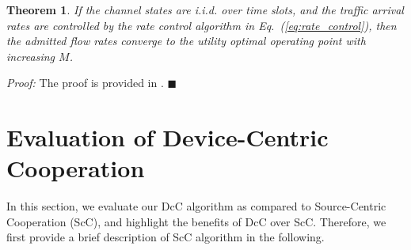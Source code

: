 \documentclass[conference]{IEEEtran}
\newtheorem{theorem}{Theorem}
\begin{document}
\begin{theorem}\label{eec_theorem2}
If the channel states are i.i.d. over time slots, and the traffic arrival rates are controlled by the rate control algorithm in Eq.~(\ref{eq:rate_control}), then the admitted flow rates converge to the utility optimal operating point with increasing $M$.
\end{theorem}
{\em Proof:} The proof is provided in \cite{thisTechRep}.
$\blacksquare$

\section{\label{sec:DcC_vs_ScC} Evaluation of Device-Centric Cooperation}
In this section, we evaluate our DcC algorithm as compared to Source-Centric Cooperation (ScC), and highlight the benefits of DcC over ScC. Therefore, we first provide a brief description of ScC algorithm in the following.
\end{document}
